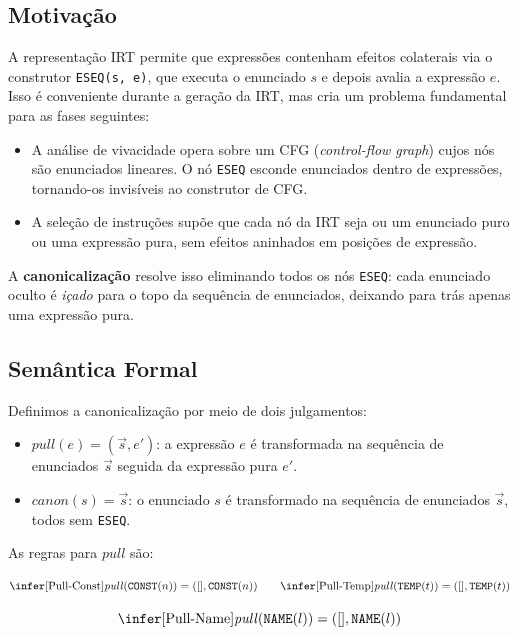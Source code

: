 \subsection{Motivação}

A representação IRT permite que expressões contenham efeitos colaterais
via o construtor \texttt{ESEQ(s, e)}, que executa o enunciado $s$ e
depois avalia a expressão $e$. Isso é conveniente durante a geração da
IRT, mas cria um problema fundamental para as fases seguintes:

\begin{itemize}
  \item A análise de vivacidade opera sobre um CFG (\emph{control-flow
    graph}) cujos nós são enunciados lineares. O nó \texttt{ESEQ}
    esconde enunciados dentro de expressões, tornando-os invisíveis ao
    construtor de CFG.
  \item A seleção de instruções supõe que cada nó da IRT seja ou um
    enunciado puro ou uma expressão pura, sem efeitos aninhados em
    posições de expressão.
\end{itemize}

A \textbf{canonicalização} resolve isso eliminando todos os nós
\texttt{ESEQ}: cada enunciado oculto é \emph{içado} para o topo da
sequência de enunciados, deixando para trás apenas uma expressão pura.

\subsection{Semântica Formal}

Definimos a canonicalização por meio de dois julgamentos:

\begin{itemize}
  \item $\mathit{pull}(e) = (\vec{s}, e')$: a expressão $e$ é
    transformada na sequência de enunciados $\vec{s}$ seguida da
    expressão pura $e'$.
  \item $\mathit{canon}(s) = \vec{s}$: o enunciado $s$ é transformado
    na sequência de enunciados $\vec{s}$, todos sem \texttt{ESEQ}.
\end{itemize}

As regras para $\mathit{pull}$ são:

\[
  \infer[\text{Pull-Const}]{\mathit{pull}(\texttt{CONST}(n)) = ([],
  \texttt{CONST}(n))}{}
  \qquad
  \infer[\text{Pull-Temp}]{\mathit{pull}(\texttt{TEMP}(t)) = ([],
  \texttt{TEMP}(t))}{}
\]

\[
  \infer[\text{Pull-Name}]{\mathit{pull}(\texttt{NAME}(l)) = ([],
  \texttt{NAME}(l))}{}
\]

